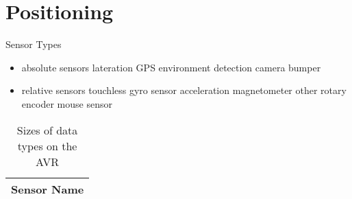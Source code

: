 \documentclass[11pt]{report}
\begin{document}



\tableofcontents



\chapter{Positioning}
\begin{table}
{\large
\begin{center}

Sensor Types\\
\begin{itemize}
\item absolute sensors
	\subitem lateration
		\subsubitem GPS	
	\subitem environment detection
		\subsubitem camera
		\subsubitem bumper
\item relative sensors
	\subitem touchless
		\subsubitem gyro sensor
		\subsubitem acceleration
		\subsubitem magnetometer
	\subitem other
		\subsubitem rotary encoder
		\subsubitem mouse sensor
\end{itemize}

\begin{tabular}{|l|}
\hline
Sensor Name\\
\hline

\hline
\end{tabular}
\end{center}
}
\caption{Sizes of data types on the AVR}
\label{tab:positioningSensors}
\end{table}



{}

\end{document}

